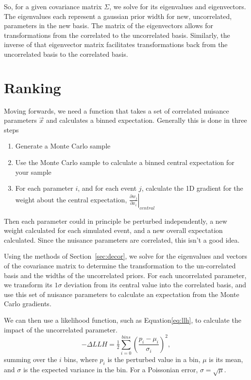 \documentclass[12pt,a4paper]{article}
\begin{document}
So, for a given covariance matrix $\Sigma$, we solve for its eigenvalues and eigenvectors. 
The eigenvalues each represent a gaussian prior width for new, uncorrelated, parameters in the new basis. 
The matrix of the eigenvectors allows for transformations from the correlated to the uncorrelated basis. 
Similarly, the inverse of that eigenvector matrix facilitates transformations back from the uncorrelated basis to the correlated basis. 

\section{Ranking}
 
Moving forwards, we need a function that takes a set of correlated nuisance parameters $\vec{x}$ and calculates a binned expectation.
Generally this is done in three steps
\begin{enumerate}
    \item Generate a Monte Carlo sample
    \item Use the Monte Carlo sample to calculate a binned central expectation for your sample
    \item For each parameter $i$, and for each event $j$, calculate the 1D gradient for the weight about the central expectation, $\left.\tfrac{\partial w_{j}}{\partial x_{i}}\right|_{central}$
\end{enumerate}
Then each parameter could in principle be perturbed independently, a new weight calculated for each simulated event, and a new overall expectation calculated. Since the nuisance parameters are correlated, this isn't a good idea.  

Using the methods of Section~\ref{sec:decor}, we solve for the eigenvalues and vectors of the covariance matrix to determine the transformation to the un-correlated basis and the widths of the uncorrelated priors. 
For each uncorrelated parameter, we transform its $1\sigma$ deviation from its central value into the correlated basis, and use this set of nuisance parameters to calculate an expectation from the Monte Carlo gradients. 

We can then use a likelihood function, such as Equation\ref{eq:llh}, to calculate the impact of the uncorrelated parameter.
\begin{equation}\label{eq:llh}
-\Delta LLH = \tfrac{1}{2}\sum_{i=0}^{bins} \left(\dfrac{p_{i}-\mu_{i}}{\sigma_{i}}\right)^{2},
\end{equation}
summing over the $i$ bins, where $p_{i}$ is the perturbed value in a bin, $\mu$ is its mean, and $\sigma$ is the expected variance in the bin. For a Poissonian error, $\sigma=\sqrt{\mu}$.  
\end{document}
